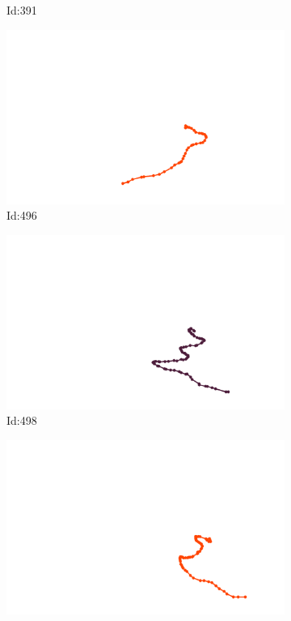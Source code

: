 \documentclass[12pt,twoside]{report}
\begin{document}
\begin{figure}
\begin{subfigure}[b]{0.20\textwidth}
\caption{Id:391}
\end{subfigure}
\begin{subfigure}[b]{0.20\textwidth}
\centering
\includegraphics[width=\textwidth]{../../trajectories/496.png}
\caption{Id:496}
\end{subfigure}
\begin{subfigure}[b]{0.20\textwidth}
\centering
\includegraphics[width=\textwidth]{../../trajectories/498.png}
\caption{Id:498}
\end{subfigure}
\begin{subfigure}[b]{0.20\textwidth}
\centering
\includegraphics[width=\textwidth]{../../trajectories/506.png}

\end{subfigure}
\end{figure}
\end{document}

